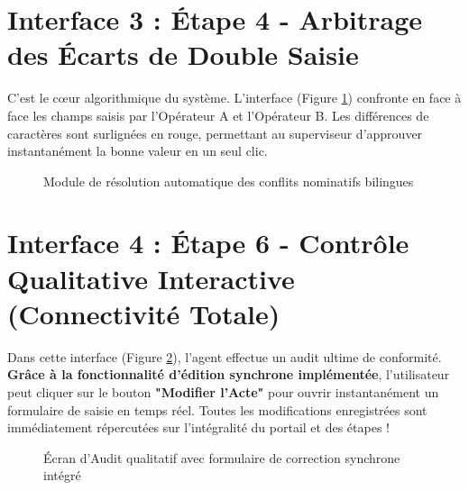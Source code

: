 \documentclass[12pt,a4paper,oneside]{report}
\begin{document}
\section{Interface 3 : Étape 4 - Arbitrage des Écarts de Double Saisie}
C'est le cœur algorithmique du système. L'interface (Figure \ref{fig:screen_arbitration}) confronte en face à face les champs saisis par l'Opérateur A et l'Opérateur B. Les différences de caractères sont surlignées en rouge, permettant au superviseur d'approuver instantanément la bonne valeur en un seul clic.
\begin{figure}[H]
    \centering
    \caption{Module de résolution automatique des conflits nominatifs bilingues}
    \label{fig:screen_arbitration}
\end{figure}

\section{Interface 4 : Étape 6 - Contrôle Qualitative Interactive (Connectivité Totale)}
Dans cette interface (Figure \ref{fig:screen_controle}), l'agent effectue un audit ultime de conformité. \textbf{Grâce à la fonctionnalité d'édition synchrone implémentée}, l'utilisateur peut cliquer sur le bouton \textbf{"Modifier l'Acte"} pour ouvrir instantanément un formulaire de saisie en temps réel. Toutes les modifications enregistrées sont immédiatement répercutées sur l'intégralité du portail et des étapes !
\begin{figure}[H]
    \centering
    \caption{Écran d'Audit qualitatif avec formulaire de correction synchrone intégré}
    \label{fig:screen_controle}
\end{figure}
\end{document}
